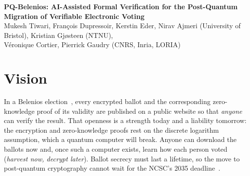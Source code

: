 \documentclass[11pt]{article}
\begin{document}
\begin{center}
{\large\bfseries PQ-Belenios: AI-Assisted Formal Verification for the Post-Quantum Migration of Verifiable Electronic Voting}\\[2pt]
{\small Mukesh Tiwari, Fran\c{c}ois Dupressoir, Kerstin Eder, Nirav Ajmeri (University of Bristol), Kristian Gj{\o}steen (NTNU),\\
V{\'e}ronique Cortier, Pierrick Gaudry (CNRS, Inria, LORIA)}
\end{center}

\section{Vision}
In a Belenios election~\cite{cortier2019belenios}, every encrypted ballot and the corresponding zero-knowledge proof 
of its validity are published on a public website
so that \emph{anyone} can verify the result. That openness is a strength today and a liability tomorrow: the
encryption and zero-knowledge proofs rest on the discrete logarithm assumption, which a quantum computer will
break. Anyone can download the ballots now and, once such a computer exists, learn how each person voted
(\emph{harvest now, decrypt later}). Ballot secrecy must last a lifetime, so the move to post-quantum
cryptography cannot wait for the NCSC's 2035 deadline~\cite{ncsc2025pqc}.
\end{document}

